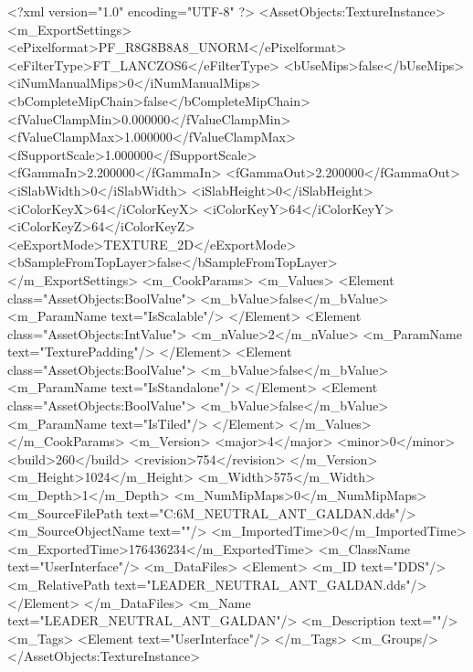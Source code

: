 <?xml version="1.0" encoding="UTF-8" ?>
<AssetObjects:TextureInstance>
	<m_ExportSettings>
		<ePixelformat>PF_R8G8B8A8_UNORM</ePixelformat>
		<eFilterType>FT_LANCZOS6</eFilterType>
		<bUseMips>false</bUseMips>
		<iNumManualMips>0</iNumManualMips>
		<bCompleteMipChain>false</bCompleteMipChain>
		<fValueClampMin>0.000000</fValueClampMin>
		<fValueClampMax>1.000000</fValueClampMax>
		<fSupportScale>1.000000</fSupportScale>
		<fGammaIn>2.200000</fGammaIn>
		<fGammaOut>2.200000</fGammaOut>
		<iSlabWidth>0</iSlabWidth>
		<iSlabHeight>0</iSlabHeight>
		<iColorKeyX>64</iColorKeyX>
		<iColorKeyY>64</iColorKeyY>
		<iColorKeyZ>64</iColorKeyZ>
		<eExportMode>TEXTURE_2D</eExportMode>
		<bSampleFromTopLayer>false</bSampleFromTopLayer>
	</m_ExportSettings>
	<m_CookParams>
		<m_Values>
			<Element class="AssetObjects:BoolValue">
				<m_bValue>false</m_bValue>
				<m_ParamName text="IsScalable"/>
			</Element>
			<Element class="AssetObjects:IntValue">
				<m_nValue>2</m_nValue>
				<m_ParamName text="TexturePadding"/>
			</Element>
			<Element class="AssetObjects:BoolValue">
				<m_bValue>false</m_bValue>
				<m_ParamName text="IsStandalone"/>
			</Element>
			<Element class="AssetObjects:BoolValue">
				<m_bValue>false</m_bValue>
				<m_ParamName text="IsTiled"/>
			</Element>
		</m_Values>
	</m_CookParams>
	<m_Version>
		<major>4</major>
		<minor>0</minor>
		<build>260</build>
		<revision>754</revision>
	</m_Version>
	<m_Height>1024</m_Height>
	<m_Width>575</m_Width>
	<m_Depth>1</m_Depth>
	<m_NumMipMaps>0</m_NumMipMaps>
	<m_SourceFilePath text="C:\Users\Josh\Documents\C6M\Oirat\Leaderscene\Portrait\newls\VeryFInal\LEADER_NEUTRAL_ANT_GALDAN.dds"/>
	<m_SourceObjectName text=""/>
	<m_ImportedTime>0</m_ImportedTime>
	<m_ExportedTime>176436234</m_ExportedTime>
	<m_ClassName text="UserInterface"/>
	<m_DataFiles>
		<Element>
			<m_ID text="DDS"/>
			<m_RelativePath text="LEADER_NEUTRAL_ANT_GALDAN.dds"/>
		</Element>
	</m_DataFiles>
	<m_Name text="LEADER_NEUTRAL_ANT_GALDAN"/>
	<m_Description text=""/>
	<m_Tags>
		<Element text="UserInterface"/>
	</m_Tags>
	<m_Groups/>
</AssetObjects:TextureInstance>

 